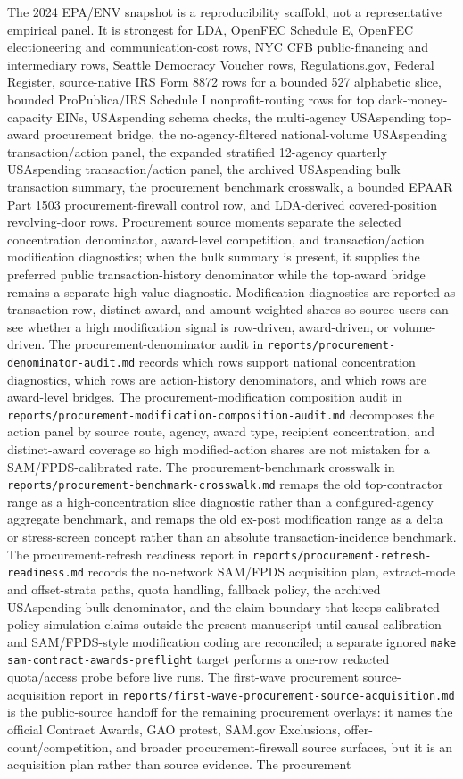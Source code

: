 The 2024 EPA/ENV snapshot is a reproducibility scaffold, not a representative empirical panel. It is strongest for LDA, OpenFEC Schedule E, OpenFEC electioneering and communication-cost rows, NYC CFB public-financing and intermediary rows, Seattle Democracy Voucher rows, Regulations.gov, Federal Register, source-native IRS Form 8872 rows for a bounded 527 alphabetic slice, bounded ProPublica/IRS Schedule I nonprofit-routing rows for top dark-money-capacity EINs, USAspending schema checks, the multi-agency USAspending top-award procurement bridge, the no-agency-filtered national-volume USAspending transaction/action panel, the expanded stratified 12-agency quarterly USAspending transaction/action panel, the archived USAspending bulk transaction summary, the procurement benchmark crosswalk, a bounded EPAAR Part 1503 procurement-firewall control row, and LDA-derived covered-position revolving-door rows. Procurement source moments separate the selected concentration denominator, award-level competition, and transaction/action modification diagnostics; when the bulk summary is present, it supplies the preferred public transaction-history denominator while the top-award bridge remains a separate high-value diagnostic. Modification diagnostics are reported as transaction-row, distinct-award, and amount-weighted shares so source users can see whether a high modification signal is row-driven, award-driven, or volume-driven. The procurement-denominator audit in \texttt{reports/procurement-denominator-audit.md} records which rows support national concentration diagnostics, which rows are action-history denominators, and which rows are award-level bridges. The procurement-modification composition audit in \texttt{reports/procurement-modification-composition-audit.md} decomposes the action panel by source route, agency, award type, recipient concentration, and distinct-award coverage so high modified-action shares are not mistaken for a SAM/FPDS-calibrated rate. The procurement-benchmark crosswalk in \texttt{reports/procurement-benchmark-crosswalk.md} remaps the old top-contractor range as a high-concentration slice diagnostic rather than a configured-agency aggregate benchmark, and remaps the old ex-post modification range as a delta or stress-screen concept rather than an absolute transaction-incidence benchmark. The procurement-refresh readiness report in \texttt{reports/procurement-refresh-readiness.md} records the no-network SAM/FPDS acquisition plan, extract-mode and offset-strata paths, quota handling, fallback policy, the archived USAspending bulk denominator, and the claim boundary that keeps calibrated policy-simulation claims outside the present manuscript until causal calibration and SAM/FPDS-style modification coding are reconciled; a separate ignored \texttt{make sam-contract-awards-preflight} target performs a one-row redacted quota/access probe before live runs. The first-wave procurement source-acquisition report in \texttt{reports/first-wave-procurement-source-acquisition.md} is the public-source handoff for the remaining procurement overlays: it names the official Contract Awards, GAO protest, SAM.gov Exclusions, offer-count/competition, and broader procurement-firewall source surfaces, but it is an acquisition plan rather than source evidence. The procurement 